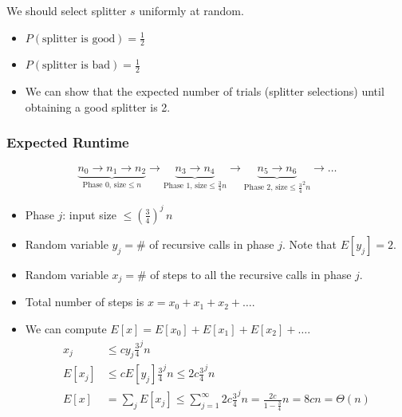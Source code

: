\documentclass[a4paper]{article}
\begin{document}
We should select splitter $s$ uniformly at random.
\begin{itemize}
    \item $P(\text{splitter is good})=\frac{1}{2}$
    \item $P(\text{splitter is bad})=\frac{1}{2}$
    \item We can show that the expected number of trials (splitter selections) until obtaining a good splitter is 2.
\end{itemize}
\subsubsection{Expected Runtime}
\begin{equation}
    \underbrace{n_0\to n_1\to n_2}_{\text{Phase 0, size}\leq n}\to \underbrace{n_3\to n_4}_{\text{Phase 1, size}\leq \frac{3}{4}n}\to \underbrace{n_5\to n_6}_{\text{Phase 2, size}\leq \frac{3}{4}^2 n}\to\dots
\end{equation}
\begin{itemize}
    \item Phase $j$: input size $\leq(\frac{3}{4})^j\,n$
    \item Random variable $y_j = $\# of recursive calls in phase $j$. Note that $E[y_j]=2$.
    \item Random variable $x_j = $\# of steps to all the recursive calls in phase $j$.
    \item Total number of steps is $x=x_0+x_1+x_2+\dots$.
    \item We can compute $E[x]=E[x_0]+E[x_1]+E[x_2]+\dots$.
    \begin{align}
        x_j&\leq c y_j \frac{3}{4}^j n\\
        E[x_j]&\leq c E[y_j] \frac{3}{4}^j n\leq 2c\frac{3}{4}^j n\\
        E[x]&=\sum_j E[x_j]\leq \sum_{j=1}^\infty 2c\frac{3}{4}^j n=\frac{2c}{1-\frac{3}{4}}n=8cn=\Theta(n)
    \end{align}
\end{itemize}
\end{document}
